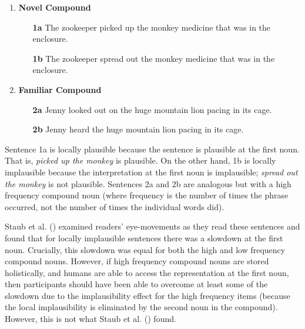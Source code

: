 \documentclass[
  12pt,
  letterpaper,
]{scrreprt}
\begin{document}
\begin{enumerate} 

    \item \textbf{Novel Compound}
    \begin{enumerate}
        \item[\textbf{1a}] The zookeeper picked up the monkey medicine that was in the enclosure.
        \item[\textbf{1b}] The zookeeper spread out the monkey medicine that was in the enclosure.
    \end{enumerate} \label{staubsentencenovel}
    \item \textbf{Familiar Compound}
    \begin{enumerate}
        \item[\textbf{2a}] Jenny looked out on the huge mountain lion pacing in its cage. \label{familiarplaus}
        \item[\textbf{2b}] Jenny heard the huge mountain lion pacing in its cage. \label{familiarimplaus}
    \end{enumerate} \label{staubsentencefamiliar}
\end{enumerate}

Sentence 1a is locally plausible because the sentence is plausible at
the first noun. That is, \emph{picked up the monkey} is plausible. On
the other hand, 1b is locally implausible because the interpretation at
the first noun is implausible; \emph{spread out the monkey} is not
plausible. Sentences 2a and 2b are analogous but with a high frequency
compound noun (where frequency is the number of times the phrase
occurred, not the number of times the individual words did).

Staub et al. ()
examined readers' eye-movements as they read these sentences and found
that for locally implausible sentences there was a slowdown at the first
noun. Crucially, this slowdown was equal for both the high and low
frequency compound nouns. However, if high frequency compound nouns are
stored holistically, and humans are able to access the representation at
the first noun, then participants should have been able to overcome at
least some of the slowdown due to the implausibility effect for the high
frequency items (because the local implausibility is eliminated by the
second noun in the compound). However, this is not what Staub et al.
() found.
\end{document}

